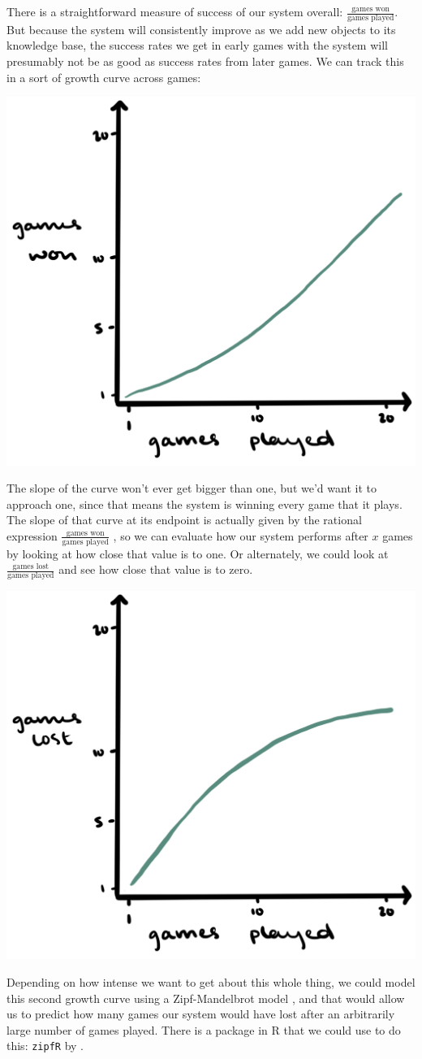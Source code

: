 \documentclass[a4paper,12pt]{article}
\begin{document}
There is a straightforward measure of success of our system overall: $\frac{\text{games won}}{\text{games played}}$. But because the system will consistently improve as we add new objects to its knowledge base, the success rates we get in early games with the system will presumably not be as good as success rates from later games. We can track this in a sort of growth curve across games:
	
\begin{center}
	\includegraphics[width=.5\linewidth]{growth-curve.png}
\end{center}

The slope of the curve won't ever get bigger than one, but we'd want it to approach one, since that means the system is winning every game that it plays.
The slope of that curve at its endpoint is actually given by the rational expression $\frac{\text{games won}}{\text{games played}}$ \citep[50--51]{Baayen2001}, so we can evaluate how our system performs after $x$ games by looking at how close that value is to one.
Or alternately, we could look at $\frac{\text{games lost}}{\text{games played}}$ and see how close that value is to zero.
\begin{center}
	\includegraphics[width=.5\linewidth]{growth-curve2.png}
\end{center}

Depending on how intense we want to get about this whole thing, we could model this second growth curve using a Zipf-Mandelbrot model \citep{Evert2004}, and that would allow us to predict how many games our system would have lost after an arbitrarily large number of games played.
There is a package in R that we could use to do this: \texttt{zipfR} by \citet{BaroniEvert2014}.
\end{document}
